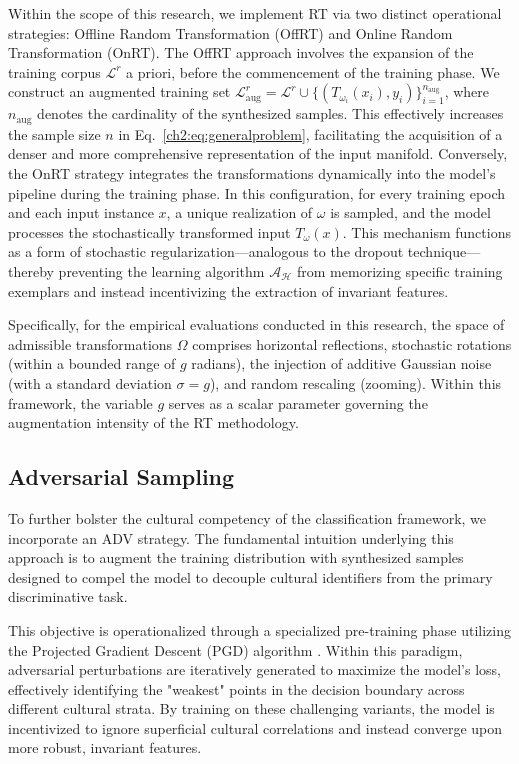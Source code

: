 Within the scope of this research, we implement RT via two distinct operational strategies: Offline Random Transformation (OffRT) and Online Random Transformation (OnRT).
The OffRT approach involves the expansion of the training corpus $\mathcal{L}^r$ a priori, before the commencement of the training phase. 
We construct an augmented training set $\mathcal{L}^r_{\text{aug}} = \mathcal{L}^r \cup \{ (T_{\omega_i}(x_i), y_i) \}_{i=1}^{n_{\text{aug}}}$, where $n_{\text{aug}}$ denotes the cardinality of the synthesized samples. 
This effectively increases the sample size $n$ in Eq.~\eqref{ch2:eq:generalproblem}, facilitating the acquisition of a denser and more comprehensive representation of the input manifold.
Conversely, the OnRT strategy integrates the transformations dynamically into the model’s pipeline during the training phase. 
In this configuration, for every training epoch and each input instance $x$, a unique realization of $\omega$ is sampled, and the model processes the stochastically transformed input $T_\omega(x)$. 
This mechanism functions as a form of stochastic regularization—analogous to the dropout technique—thereby preventing the learning algorithm $\mathscr{A}_\mathcal{H}$ from memorizing specific training exemplars and instead incentivizing the extraction of invariant features.

Specifically, for the empirical evaluations conducted in this research, the space of admissible transformations $\Omega$ comprises horizontal reflections, stochastic rotations (within a bounded range of $g$ radians), the injection of additive Gaussian noise (with a standard deviation $\sigma = g$), and random rescaling (zooming). 
Within this framework, the variable $g$ serves as a scalar parameter governing the augmentation intensity of the RT methodology.

\subsection{Adversarial Sampling}
\label{ch2:sec:adv_sampling}

To further bolster the cultural competency of the classification framework, we incorporate an ADV strategy. 
The fundamental intuition underlying this approach is to augment the training distribution with synthesized samples designed to compel the model to decouple cultural identifiers from the primary discriminative task.

This objective is operationalized through a specialized pre-training phase utilizing the Projected Gradient Descent (PGD) algorithm \citep{madry2017towards}. 
Within this paradigm, adversarial perturbations are iteratively generated to maximize the model's loss, effectively identifying the "weakest" points in the decision boundary across different cultural strata. By training on these challenging variants, the model is incentivized to ignore superficial cultural correlations and instead converge upon more robust, invariant features.

